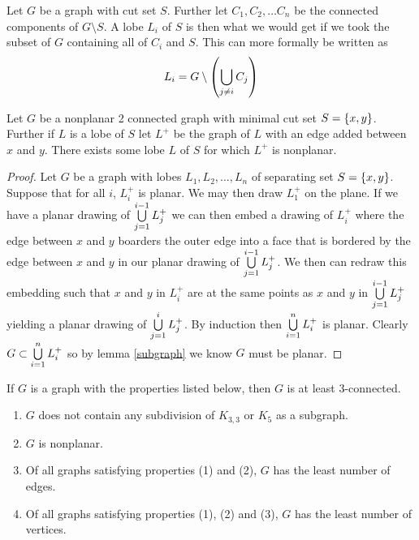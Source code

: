 \documentclass{article}
\begin{document}
\begin{definition}[lobe]
	Let $G$ be a graph with cut set $S$. Further let $C_1, C_2, \ldots C_n$ be the connected components of $G\setminus S$. A lobe $L_i$ of $S$ is then what we would get if we took the subset of $G$ containing all of $C_i$ and $S$. This can more formally be written as
	$$
	L_i = G\setminus \left(\bigcup\limits_{j\not=i}^{}  {C_j} \right)
	$$
\end{definition}

\begin{lemma}\label{lobes}
	Let $G$ be a nonplanar 2 connected graph with minimal cut set $S=\left\{ {x,y} \right\}$. Further if $L$ is a lobe of $S$ let $L^+$ be the graph of $L$ with an edge added between $x$ and $y$. There exists some lobe $L$ of $S$ for which $L^+$ is nonplanar. 
\end{lemma}
\begin{proof}
	Let $G$ be a graph with lobes $L_1, L_2, \ldots, L_n$ of separating set $S=\left\{ {x,y} \right\}$. Suppose that for all $i$, $L_i^+$ is planar. We may then draw $L_1^+$ on the plane. If we have a planar drawing of $\bigcup\limits_{j = 1}^{i-1}  {L_j^+} $ we can then embed a drawing of $L_i^+$ where the edge between $x$ and $y$ boarders the outer edge into a face that is bordered by the edge between $x$ and $y$ in our planar drawing of $\bigcup\limits_{j = 1}^{i-1}  {L_j^+} $. We then can redraw this embedding such that $x$ and $y$ in $L_i^+$ are at the same points as $x$ and $y$ in $\bigcup\limits_{j = 1}^{i-1}  {L_j^+} $ yielding a planar drawing of $\bigcup\limits_{j=1}^{i}  {L_j^+} $. By induction then $\bigcup\limits_{i=1}^{n}  {L_i^+} $ is planar. Clearly $G \subset \bigcup\limits_{i=1}^{n}  {L_i^+} $ so by lemma \ref{subgraph} we know $G$ must be planar.
\end{proof}

\begin{lemma}
	If $G$ is a graph with the properties listed below, then $G$ is at least 3-connected.
	\begin{enumerate}
		\item $G$ does not contain any subdivision of $K_{3,3}$ or $K_5$ as a subgraph.
		\item $G$ is nonplanar.
		\item Of all graphs satisfying properties (1) and (2), $G$ has the least number of edges.
		\item Of all graphs satisfying properties (1), (2) and (3), $G$ has the least number of vertices.
	\end{enumerate}
\end{lemma}
\end{document}
